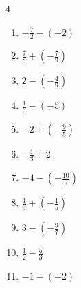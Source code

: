 \begin{multicols}{4}
\begin{enumerate}

  \item $\displaystyle -\frac{7}{2} - \left(-2\right)$


  \item $\displaystyle \frac{7}{8} + \left(-\frac{7}{9}\right)$


  \item $\displaystyle 2 - \left(-\frac{4}{9}\right)$


\columnbreak %

  \item $\displaystyle \frac{1}{3} - \left(-5\right)$


  \item $\displaystyle -2 + \left(-\frac{9}{5}\right)$


  \item $\displaystyle -\frac{1}{3} + 2$


  \item $\displaystyle -4 - \left(-\frac{10}{9}\right)$


  \item $\displaystyle \frac{1}{9} + \left(-\frac{1}{5}\right)$


  \item $\displaystyle 3 - \left(-\frac{9}{7}\right)$


  \item $\displaystyle \frac{1}{2} - \frac{5}{3}$


  \item $\displaystyle -1 - \left(-2\right)$

        \phantom{$\displaystyle =1$}


\end{enumerate}
\end{multicols}
